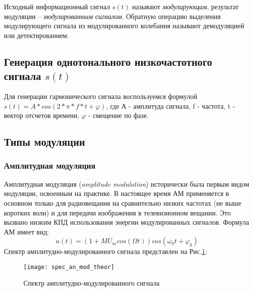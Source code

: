 Исходный информационный сигнал $s(t)$ называют \textit{модулирующим}, результат модуляции    –    \textit{модулированным сигналом}. Обратную операцию выделения модулирующего сигнала из модулированного колебания называют демодуляцией или детектированием.
\subsection{Генерация однотонального низкочастотного сигнала $s(t)$}
Для генерации гармонического сигнала воспользуемся формулой $s(t) = A*cos(2*\pi * f*t + \varphi)$, где А - амплитуда сигнала, f - частота, t - вектор отсчетов времени, $\varphi$ - смещение по фазе.

\subsection{Типы модуляции}
\subsubsection{Амплитудная модуляция}
Амплитудная модуляция (\textit{amplitude modulation}) исторически была первым видом модуляции, освоенным на практике. В настоящее время АМ применяется в основном только для радиовещания на сравнительно низких частотах (не выше коротких волн) и для передачи изображения в телевизионном вещании. Это вызвано низким КПД использования энергии модулированных сигналов. Формула АМ имеет вид: 
\begin{equation}
	u(t) = (1 + M U_m cos(\Omega t)) cos(\omega_0 t + \varphi _0)
\end{equation}
Спектр амплитудно-модулированного сигнала представлен на Рис.\ref{pic:spec_an_mod_theor}:
\begin{figure}[H]
	\begin{center}
		\texttt{[image: spec\_an\_mod\_theor]}
		\caption{Спектр амплитудно-модулированного сигнала} 
		\label{pic:spec_an_mod_theor} %
	\end{center}
\end{figure}

